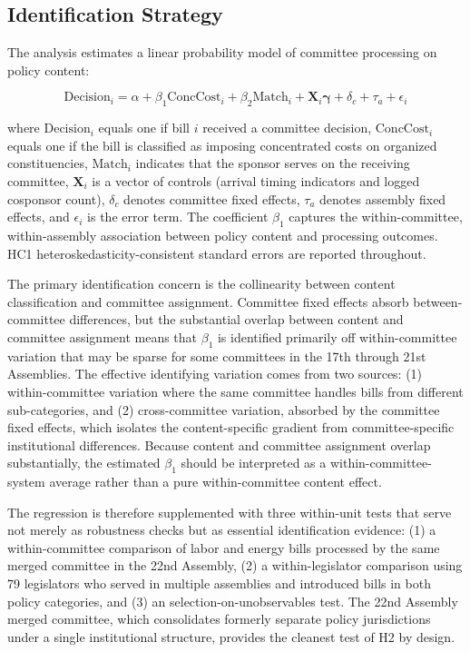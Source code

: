 \documentclass[11pt]{article}
\begin{document}
\subsection{Identification Strategy}
\label{sec:ident}

The analysis estimates a linear probability model of committee processing on policy content:

\begin{equation}
\text{Decision}_i = \alpha + \beta_1 \text{ConcCost}_i + \beta_2 \text{Match}_i + \mathbf{X}_i \boldsymbol{\gamma} + \delta_c + \tau_a + \epsilon_i
\label{eq:main}
\end{equation}

\noindent where $\text{Decision}_i$ equals one if bill $i$ received a committee decision, $\text{ConcCost}_i$ equals one if the bill is classified as imposing concentrated costs on organized constituencies, $\text{Match}_i$ indicates that the sponsor serves on the receiving committee, $\mathbf{X}_i$ is a vector of controls (arrival timing indicators and logged cosponsor count), $\delta_c$ denotes committee fixed effects, $\tau_a$ denotes assembly fixed effects, and $\epsilon_i$ is the error term. The coefficient $\beta_1$ captures the within-committee, within-assembly association between policy content and processing outcomes. HC1 heteroskedasticity-consistent standard errors are reported throughout.

The primary identification concern is the collinearity between content classification and committee assignment. Committee fixed effects absorb between-committee differences, but the substantial overlap between content and committee assignment means that $\beta_1$ is identified primarily off within-committee variation that may be sparse for some committees in the 17th through 21st Assemblies. The effective identifying variation comes from two sources: (1) within-committee variation where the same committee handles bills from different sub-categories, and (2) cross-committee variation, absorbed by the committee fixed effects, which isolates the content-specific gradient from committee-specific institutional differences. Because content and committee assignment overlap substantially, the estimated $\beta_1$ should be interpreted as a within-committee-system average rather than a pure within-committee content effect.

The regression is therefore supplemented with three within-unit tests that serve not merely as robustness checks but as essential identification evidence: (1) a within-committee comparison of labor and energy bills processed by the same merged committee in the 22nd Assembly, (2) a within-legislator comparison using 79 legislators who served in multiple assemblies and introduced bills in both policy categories, and (3) an \citet{oster2019} selection-on-unobservables test. The 22nd Assembly merged committee, which consolidates formerly separate policy jurisdictions under a single institutional structure, provides the cleanest test of H2 by design.
\end{document}
